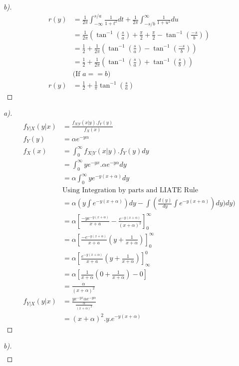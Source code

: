 \documentclass[12pt]{article}
\newenvironment{theorem}[2][Theorem]{\begin{trivlist}
\item[\hskip \labelsep {\bfseries #1}\hskip \labelsep {\bfseries #2.}]}{\end{trivlist}}
\begin{document}
\begin{theorem}[Ans]{3}
\begin{proof}[b)]
\begin{align*}
r(\hat{y})&=\frac{1}{2\pi}\int_{-\infty}^{s/a}\frac{1}{1+t^{2}}dt + \frac{1}{2\pi}\int_{-s/b}^{\infty}\frac{1}{1+u^{2}}du\\
&=\frac{1}{2\pi}(\tan^{-1}(\frac{s}{a})+\frac{\pi}{2} +\frac{\pi}{2} - \tan^{-1}(\frac{-s}{b}) )\\
&= \frac{1}{2}+\frac{1}{2\pi}(\tan^{-1}(\frac{s}{a})- \tan^{-1}(\frac{-s}{b}))\\
&= \frac{1}{2}+\frac{1}{2\pi}(\tan^{-1}(\frac{s}{a})+ \tan^{-1}(\frac{s}{b}))\\
&\text{(If }a==b\text{)}\\
r(\hat{y}) &= \frac{1}{2}+\frac{1}{\pi}\tan^{-1}(\frac{s}{a})
\end{align*}
\end{proof}
\end{theorem}
\pagebreak
\begin{theorem}[Ans]{4}
\begin{proof}[a)]
\begin{align*}
f_{Y|X}(y|x) &= \frac{f_{X|Y}(x|y).f_{Y}(y)}{f_{X}(x)}\\
f_{Y}(y) &= \alpha e^{-y\alpha}\\
f_{X}(x) &= \int_{0}^{\infty}f_{X|Y}(x|y).f_{Y}(y)dy\\
&= \int_{0}^{\infty} ye^{-yx}.\alpha e^{-y\alpha} dy\\
&= \alpha \int_{0}^{\infty}ye^{-y(x+\alpha)}dy\\
&\text{Using Integration by parts and LIATE Rule}\\
&= \alpha(y\int e^{-y(x+\alpha)})dy - \int (\frac{d(y)}{dy}\int e^{-y(x+\alpha)})dy)dy)\\
&= \alpha[\frac{-ye^{-y(x+\alpha)}}{x+a}-\frac{e^{-y(x+\alpha)}}{(x+\alpha)^{2}}]_{0}^{\infty}\\
&= \alpha[\frac{-e^{-y(x+\alpha)}}{x+a}(y+\frac{1}{x+\alpha})]_{0}^{\infty}\\
&= \alpha[\frac{e^{-y(x+\alpha)}}{x+a}(y+\frac{1}{x+\alpha})]_{\infty}^{0}\\
&= \alpha[\frac{1}{x+\alpha}(0+\frac{1}{x+\alpha})-0]\\
&= \frac{\alpha}{(x+\alpha)^{2}}\\
f_{Y|X}(y|x) &= \frac{ye^{-yx}\alpha e^{-y\alpha}}{\frac{\alpha}{(x+\alpha)^{2}}}\\
&= (x+\alpha)^2.y.e^{-y(x+\alpha)}
\end{align*}
\end{proof}
\begin{proof}[b)]
\begin{align*}

\end{align*}
\end{proof}
\end{theorem}
\end{document}
